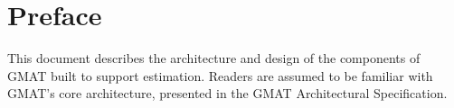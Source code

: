 \chapter{Preface}

This document describes the architecture and design of the components of GMAT built to support
estimation.  Readers are assumed to be familiar with GMAT's core architecture, presented in the
GMAT Architectural Specification\cite{archSpec}.
